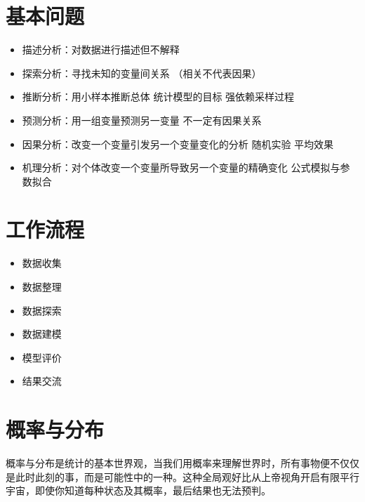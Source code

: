 \documentclass[]{book}
\providecommand{\tightlist}{%
  \setlength{\itemsep}{0pt}\setlength{\parskip}{0pt}}
\begin{document}
\hypertarget{ux57faux672cux95eeux9898}{%
\section{基本问题}\label{ux57faux672cux95eeux9898}}

\begin{itemize}
\tightlist
\item
  描述分析：对数据进行描述但不解释
\item
  探索分析：寻找未知的变量间关系 （相关不代表因果）
\item
  推断分析：用小样本推断总体 统计模型的目标 强依赖采样过程
\item
  预测分析：用一组变量预测另一变量 不一定有因果关系
\item
  因果分析：改变一个变量引发另一个变量变化的分析 随机实验 平均效果
\item
  机理分析：对个体改变一个变量所导致另一个变量的精确变化 公式模拟与参数拟合
\end{itemize}

\hypertarget{ux5de5ux4f5cux6d41ux7a0b}{%
\section{工作流程}\label{ux5de5ux4f5cux6d41ux7a0b}}

\begin{itemize}
\tightlist
\item
  数据收集
\item
  数据整理
\item
  数据探索
\item
  数据建模
\item
  模型评价
\item
  结果交流
\end{itemize}

\hypertarget{ux6982ux7387ux4e0eux5206ux5e03}{%
\section{概率与分布}\label{ux6982ux7387ux4e0eux5206ux5e03}}

概率与分布是统计的基本世界观，当我们用概率来理解世界时，所有事物便不仅仅是此时此刻的事，而是可能性中的一种。这种全局观好比从上帝视角开启有限平行宇宙，即使你知道每种状态及其概率，最后结果也无法预判。
\end{document}
